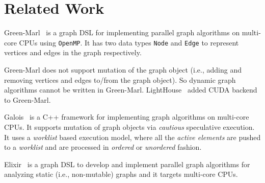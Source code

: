 \documentclass[12pt]{article}
\newcommand{\REM}[1]{}
\newcommand{\GPU}{\texttt{GPU}\xspace}
\begin{document}
\section{Related Work}\label{sec:related}
Green-Marl~\cite{Hong:2012:GDE:2150976.2151013} is a graph DSL for 
implementing parallel graph algorithms on multi-core CPUs using \texttt{OpenMP}.
It has two data types {\tt Node} and {\tt Edge} to represent vertices and edges in the graph respectively.
\REM{
 Green-Marl has three types of worklists data types namely {\tt Set}, {\tt Order} and {\tt Sequence}. These data types may contain a set of vertices in a graph. Elements in a {\tt Set} are unique but not ordered. Elements in an {\tt Order} are unique and ordered. Elements in a  {\tt Sequence} are ordered but not unique. 
Green-Marl uses {\tt Foreach} construct for parallelism.

 An example of a {\tt Foreach} statement is given below.\\

{\tt Foreach} (v : G.Nodes) (cond) \{ ... \}\\
Here all the vertices {\it v}  in the graph {\it G}  which satisfy the condition {\it cond} execute the body of the {\tt ForEach} statement. 
There are iterators for vertices ({\tt Node}) in graph like {\tt nbrs} in Green-Marl.}
 Green-Marl does not support mutation of the graph object
(i.e., adding and removing vertices and edges to/from the graph object). So dynamic graph algorithms cannot be written in Green-Marl.
LightHouse~\cite{lighthouse} added CUDA backend to Green-Marl.
\REM{ Green-Marl supports only multi-core CPUs, and  graph algorithms targeting  \GPU devices cannot be programmed in Green-Marl.}
Galois~\cite{Pingali:2011:TPA:1993316.1993501} is a C++ framework for implementing graph algorithms on multi-core CPUs. It supports mutation of graph objects via {\it cautious} speculative execution. 
It uses a {\it worklist} based execution model, where all the {\it active elements} are pushed to a {\it worklist} and are processed in {\it ordered} or {\it unordered} fashion.
\REM{Galois has a {\tt foreach} operator to process active elements in parallel. 
The {\tt foreach} operator takes as argument an  {\it ordered} or {\it unordered} worklist.
 During the processing of {\it active elements}, new {\it active elements} are created, which will be processed in the following rounds of computation. }
Elixir~\cite{Prountzos:2012:ESS:2398857.2384644} is  a graph DSL to  develop and implement parallel graph algorithms for analyzing static (i.e., non-mutable) graphs and it targets multi-core CPUs.
\REM{ Elixir uses both declarative and imperative  constructs for determining computations over a graph. }
\end{document}
